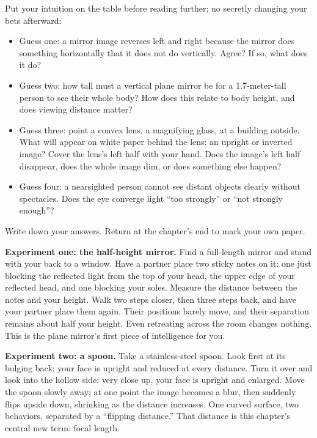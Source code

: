 \begin{mainline}

Put your intuition on the table before reading further; no secretly changing your bets afterward:

\begin{itemize}
  \item Guess one: a mirror image reverses left and right because the mirror does something horizontally that it does not do vertically. Agree? If so, what does it do?
  \item Guess two: how tall must a vertical plane mirror be for a 1.7-meter-tall person to see their whole body? How does this relate to body height, and does viewing distance matter?
  \item Guess three: point a convex lens, a magnifying glass, at a building outside. What will appear on white paper behind the lens: an upright or inverted image? Cover the lens's left half with your hand. Does the image's left half disappear, does the whole image dim, or does something else happen?
  \item Guess four: a nearsighted person cannot see distant objects clearly without spectacles. Does the eye converge light ``too strongly'' or ``not strongly enough''?
\end{itemize}

Write down your answers. Return at the chapter's end to mark your own paper.


\begin{experiment}

\textbf{Experiment one: the half-height mirror.} Find a full-length mirror and stand with your back to a window. Have a partner place two sticky notes on it: one just blocking the reflected light from the top of your head, the upper edge of your reflected head, and one blocking your soles. Measure the distance between the notes and your height. Walk two steps closer, then three steps back, and have your partner place them again. Their positions barely move, and their separation remains about half your height. Even retreating across the room changes nothing. This is the plane mirror's first piece of intelligence for you.

\textbf{Experiment two: a spoon.} Take a stainless-steel spoon. Look first at its bulging back: your face is upright and reduced at every distance. Turn it over and look into the hollow side: very close up, your face is upright and enlarged. Move the spoon slowly away; at one point the image becomes a blur, then suddenly flips upside down, shrinking as the distance increases. One curved surface, two behaviors, separated by a ``flipping distance.'' That distance is this chapter's central new term: focal length.


\end{experiment}
\end{mainline}
